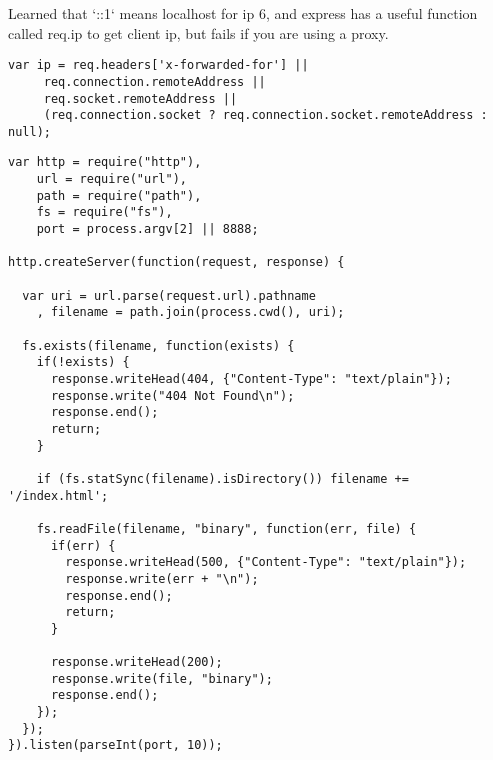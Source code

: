Learned that `::1` means localhost for ip 6, and express has a useful function called req.ip to get client ip, but fails if you are using a proxy.

\begin{lstlisting}[caption={Javascript Program get ip address}]
var ip = req.headers['x-forwarded-for'] || 
     req.connection.remoteAddress || 
     req.socket.remoteAddress ||
     (req.connection.socket ? req.connection.socket.remoteAddress : null);
\end{lstlisting}

\begin{lstlisting}[caption={Javascript Program HTTP server}]
var http = require("http"),
    url = require("url"),
    path = require("path"),
    fs = require("fs"),
    port = process.argv[2] || 8888;

http.createServer(function(request, response) {

  var uri = url.parse(request.url).pathname
    , filename = path.join(process.cwd(), uri);

  fs.exists(filename, function(exists) {
    if(!exists) {
      response.writeHead(404, {"Content-Type": "text/plain"});
      response.write("404 Not Found\n");
      response.end();
      return;
    }

    if (fs.statSync(filename).isDirectory()) filename += '/index.html';

    fs.readFile(filename, "binary", function(err, file) {
      if(err) {        
        response.writeHead(500, {"Content-Type": "text/plain"});
        response.write(err + "\n");
        response.end();
        return;
      }

      response.writeHead(200);
      response.write(file, "binary");
      response.end();
    });
  });
}).listen(parseInt(port, 10));
\end{lstlisting}